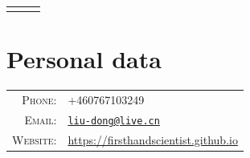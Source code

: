 \documentclass[a4paper,10pt]{article}
\begin{document}
\pagestyle{empty}


\begin{center}
  \begin{tabular}{lcr}
    \par{\centering{\Huge Dong Liu, Ph.D.}\bigskip\par} & & %
  \end{tabular}
\end{center}

\section{Personal data}

\begin{tabular}{rl}
  \textsc{Phone:} & +460767103249 \\
  \textsc{Email:} & \href{mailto:liu-dong@live.cn}{\nolinkurl{liu-dong@live.cn}}\\
  \textsc{Website:} & \href{https://firsthandscientist.github.io}{https://firsthandscientist.github.io}\\
\end{tabular}

\end{document}

